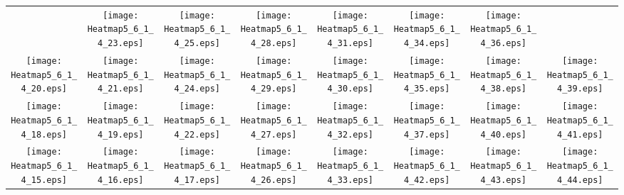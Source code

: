 \documentclass{standalone}
\begin{document}
\renewcommand{\arraystretch}{0}
\setlength{\tabcolsep}{0pt}
\begin{tabular}{ *8{c} }
 & \texttt{[image: Heatmap5\_6\_1\_4\_23.eps]} & \texttt{[image: Heatmap5\_6\_1\_4\_25.eps]} & \texttt{[image: Heatmap5\_6\_1\_4\_28.eps]} & \texttt{[image: Heatmap5\_6\_1\_4\_31.eps]} & \texttt{[image: Heatmap5\_6\_1\_4\_34.eps]} & \texttt{[image: Heatmap5\_6\_1\_4\_36.eps]} &  \\
\texttt{[image: Heatmap5\_6\_1\_4\_20.eps]} & \texttt{[image: Heatmap5\_6\_1\_4\_21.eps]} & \texttt{[image: Heatmap5\_6\_1\_4\_24.eps]} & \texttt{[image: Heatmap5\_6\_1\_4\_29.eps]} & \texttt{[image: Heatmap5\_6\_1\_4\_30.eps]} & \texttt{[image: Heatmap5\_6\_1\_4\_35.eps]} & \texttt{[image: Heatmap5\_6\_1\_4\_38.eps]} & \texttt{[image: Heatmap5\_6\_1\_4\_39.eps]} \\
\texttt{[image: Heatmap5\_6\_1\_4\_18.eps]} & \texttt{[image: Heatmap5\_6\_1\_4\_19.eps]} & \texttt{[image: Heatmap5\_6\_1\_4\_22.eps]} & \texttt{[image: Heatmap5\_6\_1\_4\_27.eps]} & \texttt{[image: Heatmap5\_6\_1\_4\_32.eps]} & \texttt{[image: Heatmap5\_6\_1\_4\_37.eps]} & \texttt{[image: Heatmap5\_6\_1\_4\_40.eps]} & \texttt{[image: Heatmap5\_6\_1\_4\_41.eps]} \\
\texttt{[image: Heatmap5\_6\_1\_4\_15.eps]} & \texttt{[image: Heatmap5\_6\_1\_4\_16.eps]} & \texttt{[image: Heatmap5\_6\_1\_4\_17.eps]} & \texttt{[image: Heatmap5\_6\_1\_4\_26.eps]} & \texttt{[image: Heatmap5\_6\_1\_4\_33.eps]} & \texttt{[image: Heatmap5\_6\_1\_4\_42.eps]} & \texttt{[image: Heatmap5\_6\_1\_4\_43.eps]} & \texttt{[image: Heatmap5\_6\_1\_4\_44.eps]} \\

\end{tabular}
\end{document}
